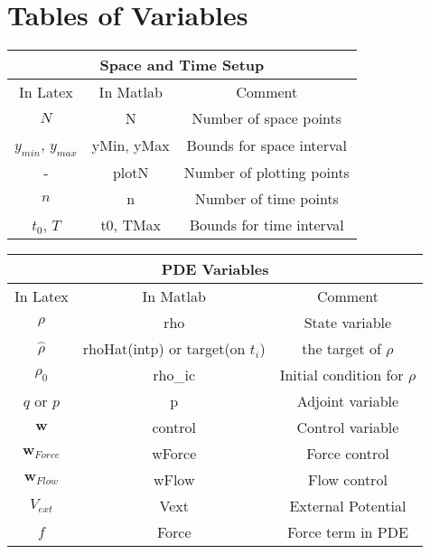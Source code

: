 \documentclass[11pt, a4paper]{article}
\theoremstyle{definition}
\begin{document}
	

\section*{Tables of Variables}
\begin{table}[h!]
	\begin{tabular}{||c | c | c ||} 
		\hline
		\multicolumn{3}{||c||}{Space and Time Setup}\\
		\hline
		In Latex & In Matlab & Comment\\
		\hline
		$N$ & N & Number of space points\\
		\hline
		$y_{min}$, $y_{max}$ & yMin, yMax & Bounds for space interval \\
		\hline
		- & plotN & Number of plotting points\\
		\hline
		$n$ & n & Number of time points\\
		\hline
		$t_{0}$, $T$ & t0, TMax & Bounds for time interval \\	
		\hline
		\hline
	\end{tabular}
\end{table}
\begin{table}[h!]

	\begin{tabular}{||c | c | c ||} 
		\hline
		\multicolumn{3}{||c||}{PDE Variables}\\
		\hline
		In Latex & In Matlab & Comment\\
		\hline
		$\rho$ & rho & State variable \\
		\hline
		$\hat \rho$ &rhoHat(intp) or target(on $t_i$) & the target of $\rho$\\
		\hline
		$\rho_0$ & rho\_ic & Initial condition for $\rho$ \\
		\hline
		$q$ or $p$ & p & Adjoint variable\\
		\hline
		$\mathbf w $ & control & Control variable \\
		\hline
		$\mathbf w_{Force}$ & wForce & Force control \\
		\hline
		$\mathbf w_{Flow}$ & wFlow & Flow control \\
		\hline
		$V_{ext}$ & Vext & External Potential \\
		\hline
		$f$ & Force & Force term in PDE \\
		\hline
		\hline
			\end{tabular}
\end{table}
\end{document}
